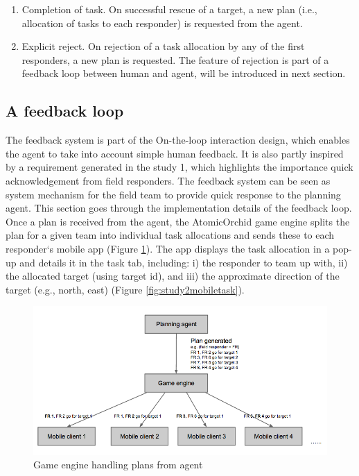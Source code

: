 \begin{enumerate}
\item Completion of task. On successful rescue of a target, a new plan (i.e., allocation of tasks to each responder) is requested from the agent.\\

\item Explicit reject. On rejection of a task allocation by any of the first responders, a new plan is requested.  The feature of rejection is part of a feedback loop between human and agent, will be introduced in next section.\\

\end{enumerate}

\subsection{A feedback loop}\label{sec:study2feedback}
The feedback system is part of the On-the-loop interaction design, which enables the agent to take into account simple human feedback. It is also partly inspired by a requirement generated in the study 1, which highlights the importance quick acknowledgement from field responders. The feedback system can be seen as system mechanism for the field team to provide quick response to the planning agent. This section goes through the implementation details of the feedback loop.\\

Once a plan is received from the agent, the AtomicOrchid game engine splits the plan for a given team into individual task allocations and sends these to each responder`s mobile app (Figure \ref{fig:handlingplans}). The app displays the task allocation in a pop-up and details it in the task tab, including: i) the responder to team up with, ii) the allocated target (using target id), and iii) the approximate direction of the target (e.g., north, east) (Figure \ref{fig:study2mobiletask}).\\

\begin{figure}[h]
  \centering
  \includegraphics[width=1\textwidth]{img/study2/system/dealingwithplans}
  \caption{Game engine handling plans from agent}
  \label{fig:handlingplans}
\end{figure}

